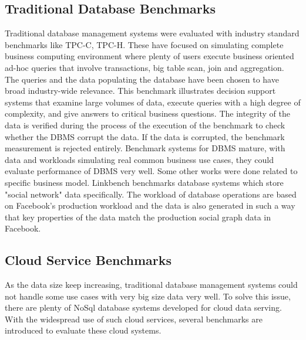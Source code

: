 \subsection{Traditional Database Benchmarks}
Traditional database management systems were evaluated with industry standard benchmarks like TPC-C,  \cite{TPC-C} TPC-H. \cite{TPC-H} These have focused on simulating complete business computing environment where plenty of users execute business oriented ad-hoc queries that involve transactions, big table scan, join and aggregation. The queries and the data populating the database have been chosen to have broad industry-wide relevance. This benchmark illustrates decision support systems that examine large volumes of data, execute queries with a high degree of complexity, and give answers to critical business questions. \cite{TPC-H} The integrity of the data is verified during the process of the execution of the benchmark to check whether the DBMS corrupt the data. If the data is corrupted, the benchmark measurement is rejected entirely. \cite{dey2014ycsb+t} Benchmark systems for DBMS mature, with data and workloads simulating real common business use cases, they could evaluate performance of DBMS very well. Some other works were done related to specific business model. Linkbench \cite{LinkBench} benchmarks database systems which store "social network" data specifically. The workload of database operations are based on Facebook's production workload and the data is also generated in such a way that key properties of the data match the production social graph data in Facebook.  

\subsection{Cloud Service Benchmarks}
As the data size keep increasing, traditional database management systems could not handle some use cases with very big size data very well. To solve this issue, there are plenty of NoSql database systems developed for cloud data serving. With the widespread use of such cloud services, several benchmarks are introduced to evaluate these cloud systems.

